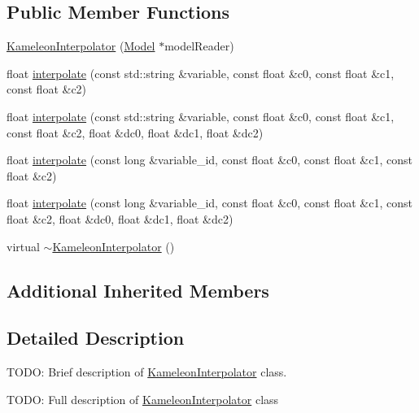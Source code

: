 \subsection*{Public Member Functions}
\begin{DoxyCompactItemize}
\item 
\hyperlink{classccmc_1_1_kameleon_interpolator_af0dcfbe00759f2e23f508dc1e86f34c0}{Kameleon\-Interpolator} (\hyperlink{classccmc_1_1_model}{Model} $\ast$model\-Reader)
\item 
float \hyperlink{classccmc_1_1_kameleon_interpolator_af1b8a5dcd9ab7a02286f665f941f23f5}{interpolate} (const std\-::string \&variable, const float \&c0, const float \&c1, const float \&c2)
\item 
float \hyperlink{classccmc_1_1_kameleon_interpolator_ac0f406b8da511a973a1d86409eb389d6}{interpolate} (const std\-::string \&variable, const float \&c0, const float \&c1, const float \&c2, float \&dc0, float \&dc1, float \&dc2)
\item 
float \hyperlink{classccmc_1_1_kameleon_interpolator_ab20ef65c8a089ce4ceef8c888272f0f9}{interpolate} (const long \&variable\-\_\-id, const float \&c0, const float \&c1, const float \&c2)
\item 
float \hyperlink{classccmc_1_1_kameleon_interpolator_a510590ccb55b491c9105a9c5db91cd42}{interpolate} (const long \&variable\-\_\-id, const float \&c0, const float \&c1, const float \&c2, float \&dc0, float \&dc1, float \&dc2)
\item 
virtual \hyperlink{classccmc_1_1_kameleon_interpolator_af873131cb1952d8bec2c77df753e8dcb}{$\sim$\-Kameleon\-Interpolator} ()
\end{DoxyCompactItemize}
\subsection*{Additional Inherited Members}


\subsection{Detailed Description}
T\-O\-D\-O\-: Brief description of \hyperlink{classccmc_1_1_kameleon_interpolator}{Kameleon\-Interpolator} class. 

T\-O\-D\-O\-: Full description of \hyperlink{classccmc_1_1_kameleon_interpolator}{Kameleon\-Interpolator} class 

